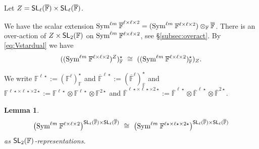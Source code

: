 \documentclass[a4paper]{extarticle}
\newcommand{\IF}{\mathbb{F}}
\newcommand{\oIF}{{\overline{\mathbb{F}}}}
\newcommand{\SL}{\textsf{\textup{SL}}}
\newcommand{\Sym}{\textup{Sym}}
\numberwithin{theorem}{section}
\newtheorem{lemma}[theorem]{Lemma}
\theoremstyle{definition}
\begin{document}
 
Let $Z = \SL_\ell(\oIF)\times\SL_\ell(\oIF)$.
 
We have the scalar extension $\Sym^{\ell m} \:\oIF^{\ell \times\ell \times 2} = (\Sym^{\ell m} \:\IF^{\ell \times\ell \times 2}) \otimes_\IF\oIF$.
There is an over-action of $Z\times\SL_2(\IF)$ on
$\Sym^{\ell m} \:\IF^{\ell \times\ell \times 2}$, see \S\ref{subsec:overact}.
By \eqref{eq:Vstardual} we have
\begin{equation}
\label{eq:afterdualizing}
((\Sym^{\ell m} \:\IF^{\ell \times\ell \times 2})^Z)^\star_\IF \ \cong \ 
((\Sym^{\ell m} \:\IF^{\ell \times\ell \times 2})^\star_\IF)_Z.
\end{equation}
 
We write $\IF^{\ell\star} := (\IF^{\ell})_\IF^\star$
and
$\oIF^{\ell\star} := (\oIF^{\ell})_\oIF^\star$
and
$\IF^{\ell\star \times\ell\star \times 2\star} :=
\IF^{\ell\star}\otimes \IF^{\ell\star}\otimes\IF^{2\star}$
and
$\oIF^{\ell\star \times\ell\star \times 2\star} := 
\oIF^{\ell\star}\otimes \oIF^{\ell\star}\otimes\oIF^{2\star}$.
\begin{lemma}\label{lem:dualisomlem}
\[\big(\Sym^{\ell m} \:\IF^{\ell \times\ell \times 2}\big)^{\SL_\ell(\oIF)\times \SL_\ell(\oIF)} \ \cong  \ \big(\Sym^{\ell m} \:\IF^{\ell\star \times\ell\star \times 2\star}\big)^{\SL_\ell(\oIF)\times \SL_\ell(\oIF)}
\]
as $\SL_2(\IF)$-representations.
\end{lemma}
\end{document}
